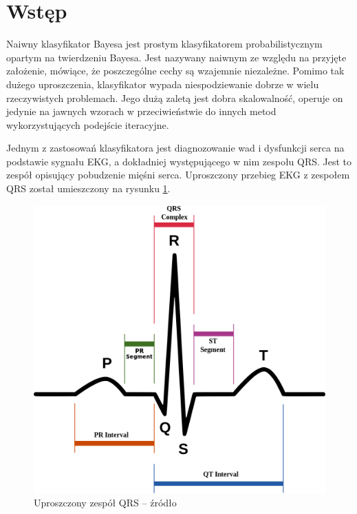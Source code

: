 \section{Wstęp}

Naiwny klasyfikator Bayesa jest prostym klasyfikatorem probabilistycznym opartym na twierdzeniu Bayesa. Jest nazywany naiwnym ze względu na przyjęte założenie, mówiące, że poszczególne cechy są wzajemnie niezależne. Pomimo tak dużego uproszczenia, klasyfikator wypada niespodziewanie dobrze w wielu rzeczywistych problemach. Jego dużą zaletą jest dobra skalowalność, operuje on jedynie na jawnych wzorach w przeciwieństwie do innych metod wykorzystujących podejście iteracyjne.

Jednym z zastosowań klasyfikatora jest diagnozowanie wad i dysfunkcji serca na podstawie sygnału EKG, a dokładniej występującego w nim zespołu QRS. Jest to zespół opisujący pobudzenie mięśni serca. Uproszczony przebieg EKG z zespołem QRS został umieszczony na rysunku \ref{fig_qrs}.

\begin{figure}[!htb]
  \begin{center}
    \includegraphics[scale = 0.25]
    {img/qrs.png}
  \end{center}
  \caption{Uproszczony zespół QRS -- źródło \cite{bibWikipedia}}
  \label{fig_qrs}
\end{figure}

